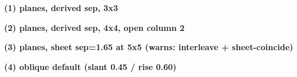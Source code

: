 \documentclass[varwidth=20cm, border=6pt]{standalone}
\begin{document}
\textbf{(1) planes, derived sep, 3x3}\par\smallskip
\begin{tenkzplanes}[rows=3, cols=3, sheets={ket, bra}]
\end{tenkzplanes}

\medskip
\textbf{(2) planes, derived sep, 4x4, open column 2}\par\smallskip
\begin{tenkzplanes}[rows=4, cols=4, sheets={ket, bra}, open={(1-4,2)}]
\end{tenkzplanes}

\medskip
\textbf{(3) planes, sheet sep=1.65 at 5x5 (warns: interleave + sheet-coincide)}%
\par\smallskip
\begin{tenkzplanes}[rows=5, cols=5, sheets={ket, bra}, sheet sep=1.65]
\end{tenkzplanes}

\medskip
\textbf{(4) oblique default (slant 0.45 / rise 0.60)}\par\smallskip
\begin{tenkzlattice}[rows=4, cols=4, frame=oblique, physical=up,
                     boundary legs]
\end{tenkzlattice}
\end{document}
